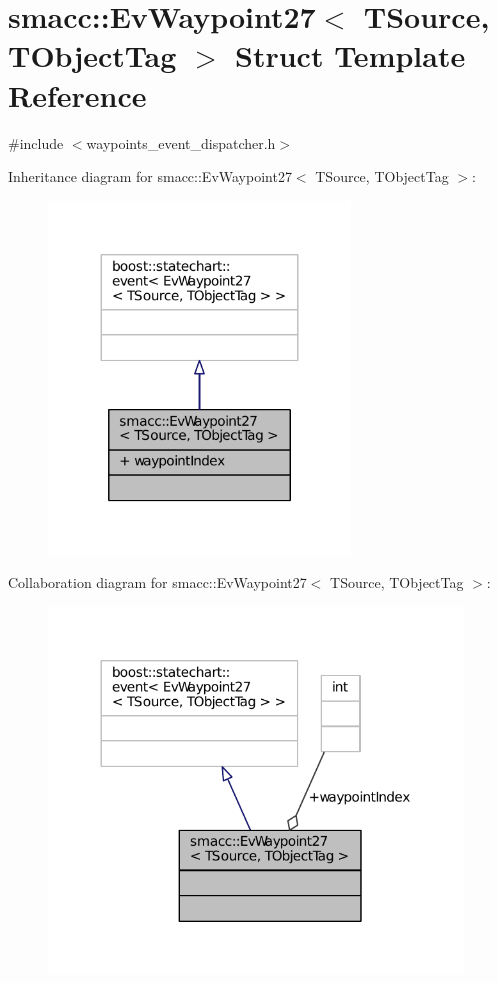 \hypertarget{structsmacc_1_1EvWaypoint27}{}\section{smacc\+:\+:Ev\+Waypoint27$<$ T\+Source, T\+Object\+Tag $>$ Struct Template Reference}
\label{structsmacc_1_1EvWaypoint27}


{\ttfamily \#include $<$waypoints\+\_\+event\+\_\+dispatcher.\+h$>$}



Inheritance diagram for smacc\+:\+:Ev\+Waypoint27$<$ T\+Source, T\+Object\+Tag $>$\+:
\nopagebreak
\begin{figure}[H]
\begin{center}
\leavevmode
\includegraphics[width=227pt]{structsmacc_1_1EvWaypoint27__inherit__graph}
\end{center}
\end{figure}


Collaboration diagram for smacc\+:\+:Ev\+Waypoint27$<$ T\+Source, T\+Object\+Tag $>$\+:
\nopagebreak
\begin{figure}[H]
\begin{center}
\leavevmode
\includegraphics[width=312pt]{structsmacc_1_1EvWaypoint27__coll__graph}
\end{center}
\end{figure}
